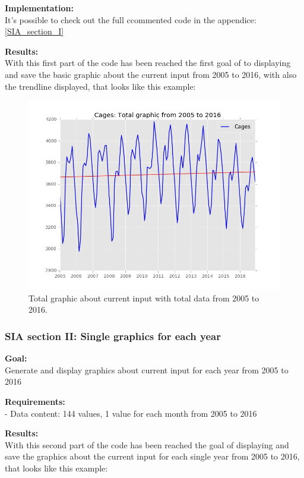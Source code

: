 \textbf{Implementation:}\\
It's possible to check out the full ccommented code in the appendice: \ref{SIA_section_I}

\textbf{Results:} \\
With this first part of the code has been reached the first goal of to displaying and save the basic graphic about the current input from 2005 to 2016, with also the trendline displayed, that looks like this example:

\begin{figure}[H]
\includegraphics[width=1\textwidth]{Files/Cages_Total.jpg}
\caption{Total graphic about current input with total data from 2005 to 2016.}
\end{figure}



\newpage
\subsubsection{SIA section II: Single graphics for each year}

\textbf{Goal:}\\
Generate and display graphics about current input for each year from 2005 to 2016

\textbf{Requirements:}\\
- Data content: 144 values, 1 value for each month from 2005 to 2016

\textbf{Results:} \\
With this second part of the code has been reached the goal of displaying and save the graphics about the current input for each single year from 2005 to 2016, that looks like this example:

